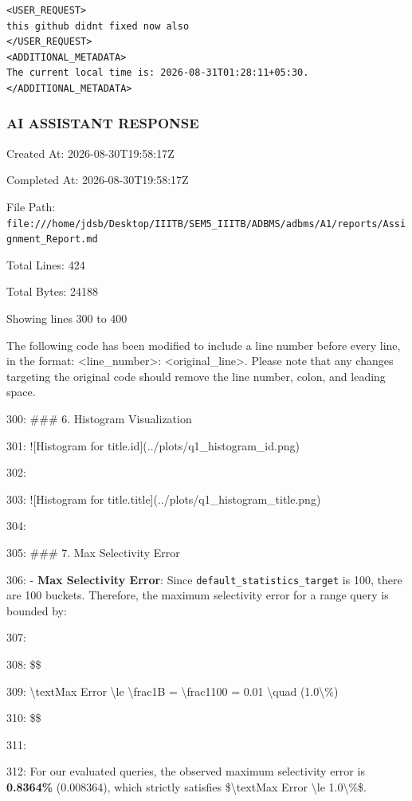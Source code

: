 \documentclass[11pt,a4paper]{article}
\begin{document}
{\begin{lstlisting}[language=text]
<USER_REQUEST>
this github didnt fixed now also 
</USER_REQUEST>
<ADDITIONAL_METADATA>
The current local time is: 2026-08-31T01:28:11+05:30.
</ADDITIONAL_METADATA>
\end{lstlisting}


\subsubsection{AI ASSISTANT RESPONSE}

Created At: 2026-08-30T19:58:17Z

Completed At: 2026-08-30T19:58:17Z

File Path: \texttt{file:///home/jdsb/Desktop/IIITB/SEM5\_IIITB/ADBMS/adbms/A1/reports/Assignment\_Report.md}

Total Lines: 424

Total Bytes: 24188

Showing lines 300 to 400

The following code has been modified to include a line number before every line, in the format: <line\_number>: <original\_line>. Please note that any changes targeting the original code should remove the line number, colon, and leading space.

300: \#\#\# 6. Histogram Visualization

301: ![Histogram for title.id](../plots/q1\_histogram\_id.png)

302:

303: ![Histogram for title.title](../plots/q1\_histogram\_title.png)

304:

305: \#\#\# 7. Max Selectivity Error

306: - \textbf{Max Selectivity Error}: Since \texttt{default\_statistics\_target} is 100, there are 100 buckets. Therefore, the maximum selectivity error for a range query is bounded by:

307:

308: \$\$

309: \textbackslash{}text{Max Error} \textbackslash{}le \textbackslash{}frac{1}{B} = \textbackslash{}frac{1}{100} = 0.01 \textbackslash{}quad (1.0\textbackslash{}\%)

310: \$\$

311:

312: For our evaluated queries, the observed maximum selectivity error is \textbf{0.8364\%} (0.008364), which strictly satisfies \$\textbackslash{}text{Max Error} \textbackslash{}le 1.0\textbackslash{}\%\$.

}
\end{document}
